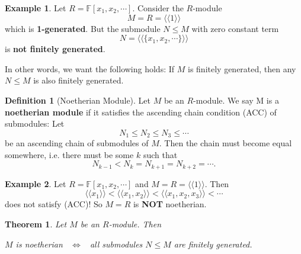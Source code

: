 \documentclass[11pt,openany]{book}
\theoremstyle{plain}
\newtheorem{theorem}{Theorem}[chapter]
\theoremstyle{definition}
\newtheorem{definition}[definition]{Definition}
\newtheorem{example}[example]{Example}
\theoremstyle{remark}
\begin{document}
\begin{example}
Let $R=\mathbb{F}[x_1,x_2,\cdots]$. Consider the $R$-module
$$M=R=\langle\langle1\rangle\rangle$$ 
which is {\bf 1-generated}. But the submodule $N\leq M$ with zero constant term 
$$N=\langle\langle\{x_1,x_2,\cdots\}\rangle\rangle$$ 
is {\bf not finitely generated}.
\end{example}

In other words, we want the following holds: If $M$ is finitely generated, then any $N\leq M$ is also finitely generated.

\begin{definition} [Noetherian Module]
 Let $M$ be an $R$-module. We say M is a {\bf noetherian module} if it satisfies the ascending chain condition (ACC) of submodules: Let 
 $$N_1\leq N_2\leq N_3\leq\cdots$$ 
 be an ascending chain of submodules of $M$. Then the chain must become equal somewhere, i.e. there must be some $k$ such that 
 $$N_{k-1}<N_k=N_{k+1}= N_{k+2} = \cdots.$$
\end{definition}

\begin{example}
    Let $R=\mathbb{F}[x_1,x_2,\cdots]$ and $M=R=\langle\langle1\rangle\rangle$. Then
    $$\langle\langle x_1\rangle\rangle < \langle\langle x_1,x_2\rangle\rangle<\langle\langle x_1, x_2, x_3\rangle\rangle<\cdots$$
    does not satisfy (ACC)! So $M=R$ is {\bf NOT} noetherian.
\end{example}

\begin{theorem}
    Let $M$ be an $R$-module. Then 
    \begin{center}
        $M$ is noetherian \ $\Leftrightarrow$ \ all submodules $N\leq M$ are finitely generated.
    \end{center}
\end{theorem}
\end{document}
